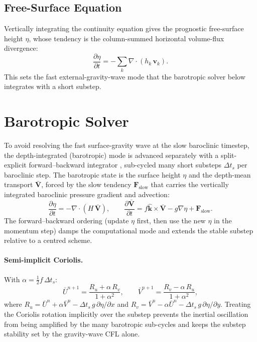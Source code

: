 \documentclass[11pt,twoside]{report}
\newcommand{\pp}{\partial}
\newcommand{\half}{\tfrac{1}{2}}
\newcommand{\vect}[1]{\bm{#1}}
\newcommand{\grad}{\nabla}
\newcommand{\divg}{\nabla\!\cdot\!}
\begin{document}
\subsection{Free-Surface Equation}

Vertically integrating the continuity equation gives the prognostic
free-surface height $\eta$, whose tendency is the column-summed
horizontal volume-flux divergence:
\begin{equation}
  \frac{\pp\eta}{\pp t} = -\sum_k \divg(h_k\,\vect{v}_k).
\end{equation}
This sets the fast external-gravity-wave mode that the barotropic solver
below integrates with a short substep.


\section{Barotropic Solver}
\label{sec:barotropic}

To avoid resolving the fast surface-gravity wave at the slow baroclinic
timestep, the depth-integrated (barotropic) mode is advanced separately
with a split-explicit forward--backward integrator
\citep{ShchepetkinMcWilliams2005}, sub-cycled many short substeps
$\Delta t_s$ per baroclinic step.  The barotropic state is the surface
height $\eta$ and the depth-mean transport $\bar{\vect{V}}$, forced by the
slow tendency $\vect{F}_{\mathrm{slow}}$ that carries the vertically
integrated baroclinic pressure gradient and advection:
\begin{equation}
  \frac{\pp\eta}{\pp t} = -\divg(H\,\bar{\vect{V}}),
  \qquad
  \frac{\pp\bar{\vect{V}}}{\pp t} = f\hat{\vect{k}}\times\bar{\vect{V}}
  - g\grad\eta + \vect{F}_{\mathrm{slow}}.
\end{equation}
The forward--backward ordering (update $\eta$ first, then use the new
$\eta$ in the momentum step) damps the computational mode and extends the
stable substep relative to a centred scheme.

\paragraph{Semi-implicit Coriolis.}
With $\alpha=\half f\,\Delta t_s$:
\begin{equation}
  \bar U^{n+1} = \frac{R_u+\alpha\,R_v}{1+\alpha^2},
  \qquad
  \bar V^{n+1} = \frac{R_v-\alpha\,R_u}{1+\alpha^2},
\end{equation}
where $R_u=\bar U^n+\alpha\bar V^n-\Delta t_s\,g\,\pp\eta/\pp x$ and
$R_v=\bar V^n-\alpha\bar U^n-\Delta t_s\,g\,\pp\eta/\pp y$.  Treating the
Coriolis rotation implicitly over the substep prevents the inertial
oscillation from being amplified by the many barotropic sub-cycles and
keeps the substep stability set by the gravity-wave CFL alone.
\end{document}
